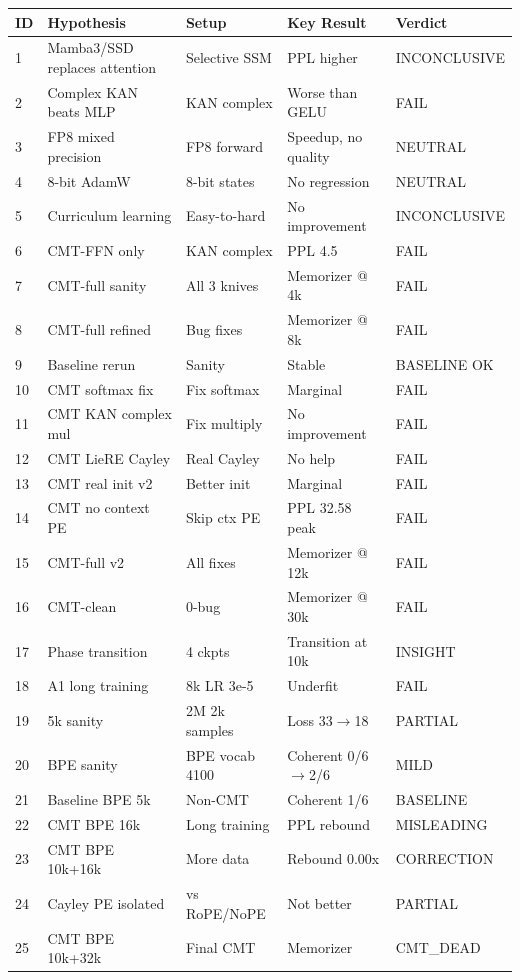 \documentclass{article}
\begin{document}
\begin{table}[h]
\centering
\small
\begin{tabular}{p{1.5cm}p{3.5cm}p{3.5cm}p{3cm}p{1.5cm}}
\toprule
ID & Hypothesis & Setup & Key Result & Verdict \\
\midrule
1 & Mamba3/SSD replaces attention & Selective SSM & PPL higher & INCONCLUSIVE \\
2 & Complex KAN beats MLP & KAN complex & Worse than GELU & FAIL \\
3 & FP8 mixed precision & FP8 forward & Speedup, no quality & NEUTRAL \\
4 & 8-bit AdamW & 8-bit states & No regression & NEUTRAL \\
5 & Curriculum learning & Easy-to-hard & No improvement & INCONCLUSIVE \\
6 & CMT-FFN only & KAN complex & PPL 4.5 & FAIL \\
7 & CMT-full sanity & All 3 knives & Memorizer @ 4k & FAIL \\
8 & CMT-full refined & Bug fixes & Memorizer @ 8k & FAIL \\
9 & Baseline rerun & Sanity & Stable & BASELINE OK \\
10 & CMT softmax fix & Fix softmax & Marginal & FAIL \\
11 & CMT KAN complex mul & Fix multiply & No improvement & FAIL \\
12 & CMT LieRE Cayley & Real Cayley & No help & FAIL \\
13 & CMT real init v2 & Better init & Marginal & FAIL \\
14 & CMT no context PE & Skip ctx PE & PPL 32.58 peak & FAIL \\
15 & CMT-full v2 & All fixes & Memorizer @ 12k & FAIL \\
16 & CMT-clean & 0-bug & Memorizer @ 30k & FAIL \\
17 & Phase transition & 4 ckpts & Transition at 10k & INSIGHT \\
18 & A1 long training & 8k LR 3e-5 & Underfit & FAIL \\
19 & 5k sanity & 2M 2k samples & Loss 33$\to$18 & PARTIAL \\
20 & BPE sanity & BPE vocab 4100 & Coherent 0/6$\to$2/6 & MILD \\
21 & Baseline BPE 5k & Non-CMT & Coherent 1/6 & BASELINE \\
22 & CMT BPE 16k & Long training & PPL rebound & MISLEADING \\
23 & CMT BPE 10k+16k & More data & Rebound 0.00x & CORRECTION \\
24 & Cayley PE isolated & vs RoPE/NoPE & Not better & PARTIAL \\
25 & CMT BPE 10k+32k & Final CMT & Memorizer & CMT\_DEAD \\
\midrule
\end{tabular}
\end{table}
\end{document}
